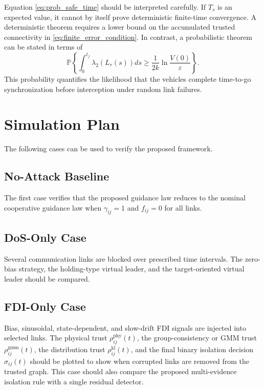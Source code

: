 \documentclass[lettersize,journal]{IEEEtran}
\begin{document}
Equation \eqref{eq:prob_safe_time} should be interpreted carefully. If $T_s$ is an expected value, it cannot by itself prove deterministic finite-time convergence. A deterministic theorem requires a lower bound on the accumulated trusted connectivity in \eqref{eq:finite_error_condition}. In contrast, a probabilistic theorem can be stated in terms of
\begin{equation}
    \mathbb{P}\left\{
    \int_0^{t_f}\lambda_2(L_r(s))ds
    \ge
    \frac{1}{2k}\ln\frac{V(0)}{\varepsilon}
    \right\}.
\end{equation}
This probability quantifies the likelihood that the vehicles complete time-to-go synchronization before interception under random link failures.

\section{Simulation Plan}

The following cases can be used to verify the proposed framework.

\subsection{No-Attack Baseline}
The first case verifies that the proposed guidance law reduces to the nominal cooperative guidance law when $\gamma_{ij}=1$ and $f_{ij}=0$ for all links.

\subsection{DoS-Only Case}
Several communication links are blocked over prescribed time intervals. The zero-bias strategy, the holding-type virtual leader, and the target-oriented virtual leader should be compared.

\subsection{FDI-Only Case}
Bias, sinusoidal, state-dependent, and slow-drift FDI signals are injected into selected links. The physical trust $\rho_{ij}^{\mathrm{phy}}(t)$, the group-consistency or GMM trust $\rho_{ij}^{\mathrm{gmm}}(t)$, the distribution trust $\rho_{ij}^{\mathrm{kl}}(t)$, and the final binary isolation decision $\sigma_{ij}(t)$ should be plotted to show when corrupted links are removed from the trusted graph. This case should also compare the proposed multi-evidence isolation rule with a single residual detector.
\end{document}

